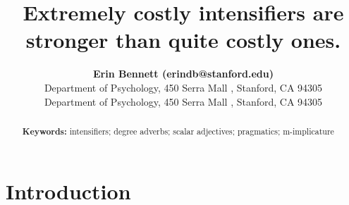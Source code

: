\documentclass[10pt,letterpaper]{article}
\title{Extremely costly intensifiers are stronger than quite costly ones.}
\author{{\large \bf Erin Bennett (erindb@stanford.edu)} \\
  Department of Psychology, 450 Serra Mall , Stanford, CA 94305
  \AND {\large \bf Noah Goodman (ngoodman@stanford.edu)} \\
  Department of Psychology, 450 Serra Mall , Stanford, CA 94305}
\begin{document}
\maketitle


\begin{abstract}


\textbf{Keywords:} 
intensifiers; degree adverbs; scalar adjectives; pragmatics; m-implicature
\end{abstract}


\section{Introduction}





\end{document}
